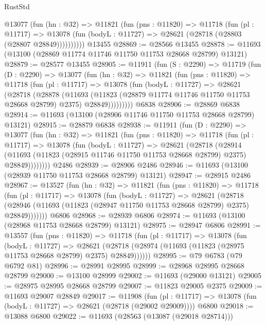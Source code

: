 \begin{lexlean}{RustStd}
\begin{coremodule}
        @13077
          (fun (hn : @32) =>
          @11821
            (fun (pns : @11820) =>
            @11718
              (fun (pl : @11717) =>
              @13078 (fun (bodyL : @11727) => @28621 (@28718 (@28803 (@28807 @28849))))))))))
    @13455
@28869 := @28566 @13455
@28878 := @11693 (@13100 (@28869 @11774 @11746 @11750 @11753 @28668 @28799) @13121)
@28879 := @28577 @13455
@28905 := @11911
    (fun (S : @2290) =>
    @11719
      (fun (D : @2290) =>
      @13077
        (fun (hn : @32) =>
        @11821
          (fun (pns : @11820) =>
          @11718
            (fun (pl : @11717) =>
            @13078
              (fun (bodyL : @11727) =>
              @28621
                (@28718
                  (@28878
                    (@11693
                      (@11823 (@28879 @11774 @11746 @11750 @11753 @28668 @28799) @2375)
                      @28849)))))))))
    @6838
@28906 := @28869 @6838
@28914 := @11693 (@13100 (@28906 @11746 @11750 @11753 @28668 @28799) @13121)
@28915 := @28879 @6838
@28938 := @11911
    (fun (D : @2290) =>
    @13077
      (fun (hn : @32) =>
      @11821
        (fun (pns : @11820) =>
        @11718
          (fun (pl : @11717) =>
          @13078
            (fun (bodyL : @11727) =>
            @28621
              (@28718
                (@28914
                  (@11693 (@11823 (@28915 @11746 @11750 @11753 @28668 @28799) @2375) @28849))))))))
    @2486
@28939 := @28906 @2486
@28946 := @11693 (@13100 (@28939 @11750 @11753 @28668 @28799) @13121)
@28947 := @28915 @2486
@28967 := @13527
    (fun (hn : @32) =>
    @11821
      (fun (pns : @11820) =>
      @11718
        (fun (pl : @11717) =>
        @13078
          (fun (bodyL : @11727) =>
          @28621
            (@28718
              (@28946 (@11693 (@11823 (@28947 @11750 @11753 @28668 @28799) @2375) @28849)))))))
    @6806
@28968 := @28939 @6806
@28974 := @11693 (@13100 (@28968 @11753 @28668 @28799) @13121)
@28975 := @28947 @6806
@28991 := @13557
    (fun (pns : @11820) =>
    @11718
      (fun (pl : @11717) =>
      @13078
        (fun (bodyL : @11727) =>
        @28621 (@28718 (@28974 (@11693 (@11823 (@28975 @11753 @28668 @28799) @2375) @28849))))))
@28995 := @79 @6783 (@79 @6792 @81)
@28996 := @28991 @28995
@28999 := @28968 @28995 @28668 @28799
@29000 := @13100 @28999
@29002 := @11693 (@29000 @13121)
@29005 := @28975 @28995 @28668 @28799
@29007 := @11823 @29005 @2375
@29009 := @11693 @29007 @28849
@29017 := @11908
    (fun (pl : @11717) => @13078 (fun (bodyL : @11727) => @28621 (@28718 (@29002 @29009))))
    @6800
@29018 := @13088 @6800
@29022 := @11693 (@28563 (@13087 (@29018 @28714)))

\end{coremodule}
\end{lexlean}

